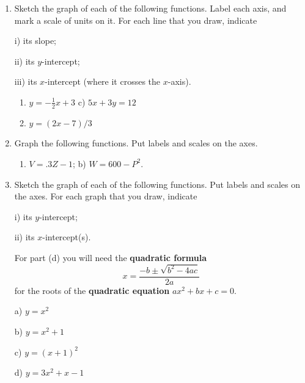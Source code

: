 \begin{enumerate}
\item Sketch the graph of each of the following functions.  Label each
axis, and mark a scale of units on it.  For each line that you draw,
indicate

	i) its slope;

	ii) its $y$-intercept;

	iii) its $x$-intercept (where it crosses the
        $x$-axis).


  \begin{enumerate}
  \item $y =  -\tfrac{1}{2} x + 3$ \hfill c) $5x + 3y = 12$
\hfill \mbox{}


  \item $y = (2 x - 7)/3$


\end{enumerate}
\item Graph the following functions.  Put labels and scales on the
axes.

  \begin{enumerate}
  \item $V = .3Z -1$; \hfill b)  $W = 600 - P^2$. \hfill \mbox{}


\end{enumerate}
\item Sketch the graph of each of the following functions.  Put labels
and scales on the axes.  For each graph that you draw, indicate

	i) its $y$-intercept;

	ii) its $x$-intercept(s).


For part (d) you will need the {\bf quadratic formula}
\[
x = \frac{- b \pm \sqrt{b^2 - 4ac}}{2a}
\] 
for the roots of the {\bf quadratic equation} $ax^2 + bx + c = 0.$




a) $y = x^2 $ 	

b) $y = x^2 + 1$

c) $y = (x+1)^2$ 

d) $y = 3x^2 +x -1$
\mbox{}




\end{enumerate}
